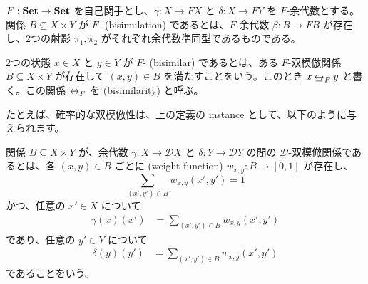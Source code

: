 \documentclass[
		head_space=20mm,
		foot_space=20mm,
		gutter=10mm,
		line_length=190mm
]{jlreq}
\begin{document}


\begin{definition}
	$F:\mathbf{Set}\to\mathbf{Set}$ を自己関手とし、$\gamma:X\to FX$ と $\delta:X\to FY$ を $F$-余代数とする。関係 $B\subseteq X\times Y$ が $F$- (bisimulation) であるとは、$F$-余代数 $\beta:B\to FB$ が存在し、2つの射影 $\pi_1,\pi_2$ がそれぞれ余代数準同型であるものである。\vspace{3pt}
	\begin{center}
	\end{center}\vspace{3pt}
	2つの状態 $x\in X$ と $y\in Y$ が $F$- (bisimilar) であるとは、ある $F$-双模倣関係 $B\subseteq X\times Y$ が存在して $(x,y)\in B$ を満たすことをいう。このとき $x\mathbin{\,\underline{\!\leftrightarrow\!}\,}_F y$ と書く。この関係 $\mathbin{\,\underline{\!\leftrightarrow\!}\,}_F$ を (bisimilarity) と呼ぶ。
\end{definition}

\noindent たとえば、確率的な双模倣性は、上の定義の instance として、以下のように与えられます。

\begin{example}
	関係 $B\subseteq X\times Y$ が、余代数 $\gamma:X\to\mathcal DX$ と $\delta:Y\to\mathcal DY$ の間の $\mathcal D$-双模倣関係であるとは、各 $(x,y)\in B$ ごとに (weight function) $w_{x,y}:B\to[0,1]$ が存在し、
	\[\sum_{(x',y')\in B}w_{x,y}(x',y')=1\] 
	かつ、任意の $x'\in X$ について 
	\begin{align*}
		\gamma(x)(x')&=\sum_{(x',y')\in B}w_{x,y}(x',y')  
	\end{align*}
	であり、任意の $y'\in Y$ について
	\begin{align*}
		\delta(y)(y')&=\sum_{(x',y')\in B}w_{x,y}(x',y')
	\end{align*}
	であることをいう。
\end{example}
\end{document}

